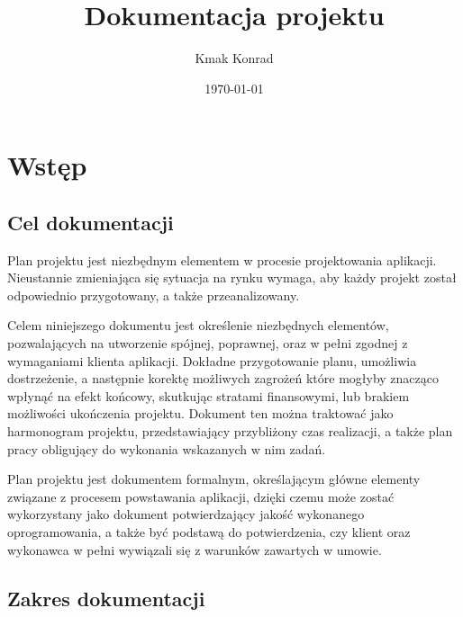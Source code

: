 \documentclass[12pt,a4paper]{article}
\title{Dokumentacja projektu}
\author{Kmak Konrad}
\date{\today}
\begin{document}
\maketitle

\newpage

\tableofcontents

\newpage

\section{Wstęp}
\subsection{Cel dokumentacji}

Plan projektu jest niezbędnym elementem w procesie projektowania aplikacji. Nieustannie zmieniająca się sytuacja na rynku wymaga, aby każdy projekt został odpowiednio przygotowany, a także przeanalizowany. 

Celem niniejszego dokumentu jest określenie niezbędnych elementów, pozwalających na utworzenie spójnej, poprawnej, oraz w pełni zgodnej z wymaganiami klienta aplikacji. Dokładne przygotowanie planu, umożliwia dostrzeżenie, a następnie korektę możliwych zagrożeń które mogłyby znacząco wpłynąć na efekt końcowy, skutkując stratami finansowymi, lub brakiem możliwości ukończenia projektu. Dokument ten można traktować jako harmonogram projektu, przedstawiający przybliżony czas realizacji, a także plan pracy obligujący do wykonania wskazanych w nim zadań. 

Plan projektu jest dokumentem formalnym, określającym główne elementy związane z procesem powstawania aplikacji, dzięki czemu może zostać wykorzystany jako dokument potwierdzający jakość wykonanego oprogramowania, a także być podstawą do potwierdzenia, czy klient oraz wykonawca w pełni wywiązali się z warunków zawartych w umowie.

\subsection{Zakres dokumentacji}
\end{document}
